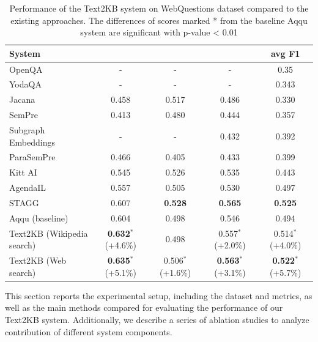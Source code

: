 \begin{table}[ht!]
\label{table:webquestions_results}
\begin{minipage}{17cm}
\centering
\begin{tabular}{| p{4.5cm} | c | c | c | c | }
\hline
System & \centering{avg Recall} & \centering{avg Precision} & \centering{F1 of avg P and R} & avg F1 \\
\hline
OpenQA \cite{Fader:2014:OQA:2623330.2623677} & - & - & - & 0.35 \\
YodaQA \cite{baudivs2015systems} & - & - & - & 0.343 \\
\hline
Jacana \cite{yao2014information} & 0.458 & 0.517 & 0.486 & 0.330\\
SemPre \cite{Berant:EMNLP13} & 0.413 & 0.480 & 0.444 & 0.357\\
Subgraph Embeddings \cite{BordesCW14:emnlp} & - & - & 0.432 & 0.392\\
ParaSemPre \cite{berant2014semantic} & 0.466 & 0.405 & 0.433 & 0.399\\
Kitt AI \cite{yao-scratch-qa-naacl2015} & 0.545 & 0.526 & 0.535 & 0.443\\
AgendaIL \cite{berant2015imitation} & 0.557 & 0.505 & 0.530 & 0.497\\
STAGG \cite{yih2015semantic} & 0.607 & \textbf{0.528} & \textbf{0.565} & \textbf{0.525}\\
\hline
Aqqu (baseline) \cite{ACCU:2015} & 0.604 & 0.498 & 0.546 & 0.494\\
Text2KB (Wikipedia search) & \textbf{0.632}$^*$ (+4.6\%) & 0.498 & 0.557$^*$ (+2.0\%) & 0.514$^*$ (+4.0\%) \\
Text2KB (Web search) & \textbf{0.635}$^*$ (+5.1\%) & 0.506$^*$ (+1.6\%) & \textbf{0.563}$^*$ (+3.1\%) & \textbf{0.522}$^*$ (+5.7\%) \\
\hline
\end{tabular}
\end{minipage}
\vspace{-2mm}
\caption{Performance of the Text2KB system on WebQuestions dataset compared to the existing approaches. The differences of scores marked * from the baseline Aqqu system are significant with p-value < 0.01}
\end{table}

This section reports the experimental setup, including the dataset and metrics, as well as the main methods compared for evaluating the performance of our Text2KB system. Additionally, we describe a series of ablation studies to analyze contribution of different system components.

